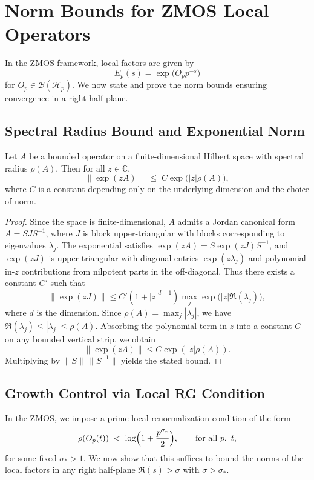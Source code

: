 \documentclass[11pt]{article}
\begin{document}
\section{Norm Bounds for ZMOS Local Operators}

In the ZMOS framework, local factors are given by
\[
  E_p(s) = \exp\!\bigl(O_p p^{-s}\bigr)
\]
for $O_p \in \mathcal{B}(\mathcal{H}_p)$. We now state and prove the
norm bounds ensuring convergence in a right half-plane.

\subsection{Spectral Radius Bound and Exponential Norm}

\begin{lemma}
\label{lem:exp_bound}
Let $A$ be a bounded operator on a finite-dimensional Hilbert space with
spectral radius $\rho(A)$. Then for all $z \in \mathbb{C}$,
\[
  \|\exp(z A)\|
  \;\le\; C \exp\bigl(|z|\rho(A)\bigr),
\]
where $C$ is a constant depending only on the underlying dimension and
the choice of norm.
\end{lemma}

\begin{proof}
Since the space is finite-dimensional, $A$ admits a Jordan canonical form
$A = S J S^{-1}$, where $J$ is block upper-triangular with blocks
corresponding to eigenvalues $\lambda_j$. The exponential satisfies
$\exp(zA) = S \exp(zJ) S^{-1}$, and $\exp(zJ)$ is upper-triangular with
diagonal entries $\exp(z\lambda_j)$ and polynomial-in-$z$ contributions
from nilpotent parts in the off-diagonal. Thus there exists a constant
$C'$ such that
\[
  \|\exp(zJ)\|
  \le C'(1+|z|^{d-1}) \max_j \exp\bigl(|z|\Re(\lambda_j)\bigr),
\]
where $d$ is the dimension. Since $\rho(A)=\max_j|\lambda_j|$, we have
$\Re(\lambda_j)\le |\lambda_j|\le \rho(A)$. Absorbing the polynomial term
in $z$ into a constant $C$ on any bounded vertical strip, we obtain
\[
  \|\exp(zA)\| \le C \exp(|z|\rho(A)).
\]
Multiplying by $\|S\|\,\|S^{-1}\|$ yields the stated bound.
\end{proof}

\subsection{Growth Control via Local RG Condition}

In the ZMOS, we impose a prime-local renormalization condition of the
form
\begin{equation}
  \rho(O_p(t))
  \;<\; \log\Bigl(1 + \frac{p^{\sigma_*}}{2}\Bigr),
  \qquad \text{for all } p,\ t,
  \label{eq:RGappendix}
\end{equation}
for some fixed $\sigma_* > 1$. We now show that this suffices to bound
the norms of the local factors in any right half-plane $\Re(s)>\sigma$
with $\sigma>\sigma_*$.
\end{document}
